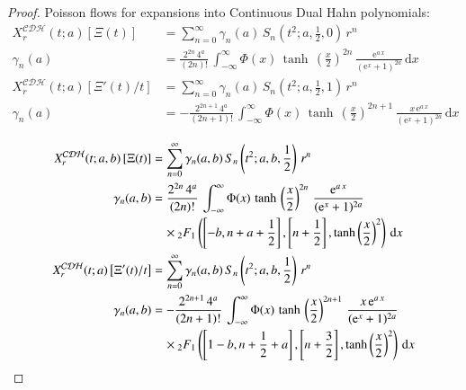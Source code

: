 \documentclass[a4paper,11pt,twoside]{amsart}
\newcommand{\verifiedeq}{=}
\newcommand{\verifiedeq}{\stackrel{\checkmark}{=}}
\begin{document}
\begin{proof}
Poisson flows for expansions into Continuous Dual Hahn polynomials:
\begin{align}
X^\mathcal{CDH}_r(t;a)\left[\Xi(t)\right] &\verifiedeq \sum_{n=0}^\infty \gamma_{n}(a)\,S_{n}\left(t^2;a,\frac12,0\right)\,r^{n} \\
\gamma_n(a) &\verifiedeq \frac{2^{2n}\,4^a}{(2n)!}\,\int_{-\infty}^{\infty} \Phi(x)\,\tanh\,\left(\frac{x}{2}\right)^{2n}\,\frac{\textrm{e}^{a\,x}}{(\textrm{e}^x+1)^{2a}}\,\mathrm{d}x \\
X^\mathcal{CDH}_r(t;a)\left[\Xi'(t)/t\right] &\verifiedeq \sum_{n=0}^\infty \gamma_{n}(a)\,S_{n}\left(t^2;a,\frac12,1\right)\,r^{n} \\
\gamma_n(a) &\verifiedeq -\frac{2^{2n+1}\,4^a}{(2n+1)!}\,\int_{-\infty}^{\infty} \Phi(x)\,\tanh\,\left(\frac{x}{2}\right)^{2n+1}\,\frac{x\,\textrm{e}^{a\,x}}{(\textrm{e}^x+1)^{2a}}\,\mathrm{d}x
\end{align}

\begin{align}
X^\mathcal{CDH}_r(t;a,b)\left[\Xi(t)\right] &\verifiedeq \sum_{n=0}^\infty \gamma_{n}(a,b)\,S_{n}\left(t^2;a,b,\frac12\right)\,r^{n} \\
\gamma_n(a,b) &\verifiedeq \frac{2^{2n}\,4^a}{(2n)!}\,\int_{-\infty}^{\infty} \Phi(x)\,\tanh\,\left(\frac{x}{2}\right)^{2n}\,\frac{\textrm{e}^{a\,x}}{(\textrm{e}^x+1)^{2a}} \\ &\quad \times {}_2F_1\left(\left[-b, n+a+\frac12\right],\left[n+\frac12\right],\tanh\left(\frac{x}{2}\right)^2\right)\,\mathrm{d}x \notag \\
X^\mathcal{CDH}_r(t;a)\left[\Xi'(t)/t\right] &\verifiedeq \sum_{n=0}^\infty \gamma_{n}(a,b)\,S_{n}\left(t^2;a,b,\frac12\right)\,r^{n} \\
\gamma_n(a,b) &\verifiedeq -\frac{2^{2n+1}\,4^a}{(2n+1)!}\,\int_{-\infty}^{\infty} \Phi(x)\,\tanh\,\left(\frac{x}{2}\right)^{2n+1}\,\frac{x\,\textrm{e}^{a\,x}}{(\textrm{e}^x+1)^{2a}}\\\ &\quad\times{}_2F_1\left(\left[1-b, n+\frac12+a\right],\left[n+\frac32\right],\tanh\left(\frac{x}{2}\right)^2\right)\,\mathrm{d}x \notag
\end{align}


\end{proof}
\end{document}

